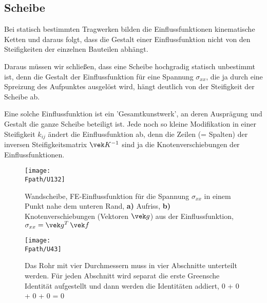 {{{%
{\textcolor{blau2}{\subsection{Scheibe}}}
Bei statisch bestimmten Tragwerken bilden die Einflussfunktionen kinematische Ketten und daraus folgt, dass die Gestalt einer Einflussfunktion
nicht von den Steifigkeiten der einzelnen Bauteilen abh\"{a}ngt.

Daraus m\"{u}ssen wir schlie{\ss}en, dass eine Scheibe hochgradig statisch unbestimmt ist, denn die Gestalt der Einflussfunktion f\"{u}r eine Spannung $\sigma_{xx}$, die ja durch eine Spreizung des Aufpunktes ausgel\"{o}st wird, h\"{a}ngt deutlich von der Steifigkeit der Scheibe ab.

Eine solche Einflussfunktion ist ein 'Gesamtkunstwerk', an deren Auspr\"{a}gung und Gestalt die ganze Scheibe beteiligt ist. Jede noch so kleine Modifikation in einer Steifigkeit $k_{ij}$ \"{a}ndert die Einflussfunktion ab, denn die Zeilen (= Spalten) der inversen Steifigkeitsmatrix $\vek K^{-1}$ sind ja die Knotenverschiebungen  der Einflussfunktionen.\\

\begin{figure}[tbp]
\centering
\if {} \sidecaption \fi
\texttt{[image: \\Fpath/U132]}
  \caption{Wandscheibe, FE-Einflussfunktion f\"{u}r die Spannung $\sigma_{xx}$ in einem Punkt nahe dem unteren Rand, \textbf{ a)} Aufriss, \textbf{ b)} Knotenverschiebungen (Vektoren $\vek g$) aus der Einflussfunktion, $\sigma_{xx} = \vek g^T\,\vek f$}
  \label{U132}
%
\end{figure}

\begin{figure}[tbp]
\centering
\if {} \sidecaption \fi
\texttt{[image: \\Fpath/U43]}
\caption{Das Rohr mit vier Durchmessern muss in vier Abschnitte unterteilt werden. F\"{u}r jeden Abschnitt wird separat die erste Greensche Identit\"{a}t aufgestellt und dann werden die Identit\"{a}ten addiert, 0 + 0 + 0  + 0 = 0} \label{U43}
%
\end{figure}%

}}}
